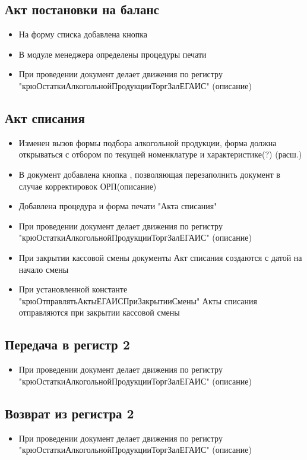 \subsection{Акт постановки на баланс}
\begin{itemize}
	\item На форму списка добавлена кнопка 
	\item В модуле менеджера определены процедуры печати
	\item При проведении документ делает движения по регистру "крюОстаткиАлкогольнойПродукцииТоргЗалЕГАИС"
	(описание)
\end{itemize}




\subsection{Акт списания}
\begin{itemize}
	\item Изменен вызов формы подбора алкогольной продукции, форма должна открываться с отбором по текущей номенклатуре и характеристике(?)
	(расш.)
	\item В документ добавлена кнопка  , позволяющая перезаполнить документ в случае корректировок ОРП(описание)
	\item Добавлена процедура и форма печати "Акта списания"
	\item При проведении документ делает движения по регистру "крюОстаткиАлкогольнойПродукцииТоргЗалЕГАИС"
	(описание)
	\item При закрытии кассовой смены документы Акт списания создаются с датой на начало смены
	\item При установленной константе "крюОтправлятьАктыЕГАИСПриЗакрытииСмены" Акты списания отправляются при закрытии кассовой смены
\end{itemize}

\subsection{Передача в регистр 2}
\begin{itemize}
	\item При проведении документ делает движения по регистру "крюОстаткиАлкогольнойПродукцииТоргЗалЕГАИС"
	(описание)
\end{itemize}

\subsection{Возврат из регистра 2}
\begin{itemize}
	\item При проведении документ делает движения по регистру "крюОстаткиАлкогольнойПродукцииТоргЗалЕГАИС"
	(описание)
\end{itemize}

